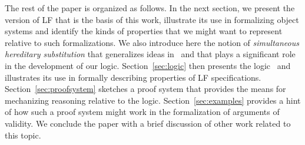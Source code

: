 The rest of the paper is organized as follows.
%
In the next section, we present the version of LF that is the basis of
this work, illustrate its use in formalizing object systems and
identify the kinds of properties that we might want to represent
relative to such formalizations. 
%
We also introduce here the notion of  \emph{simultaneous
hereditary substitution} that generalizes ideas in~\cite{harper07jfp}
and that plays a significant role in the development of our logic. 
%
Section~\ref{sec:logic} then presents the logic \logic\ and illustrates
its use in formally describing properties of LF specifications. 
%
Section~\ref{sec:proofsystem} sketches a proof system that provides
the means for mechanizing reasoning relative to the logic. 
%
Section~\ref{sec:examples} provides a hint of how such a proof system
might work in the formalization of arguments of validity. 
%
We conclude the paper with a brief discussion of other work related to
this topic. 
